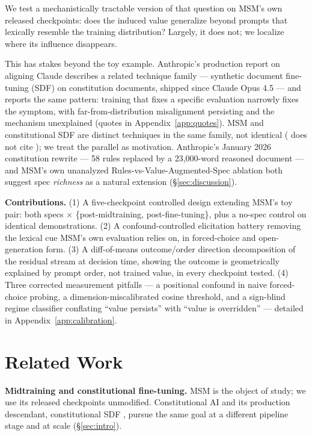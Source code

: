 \documentclass{article}
\begin{document}
We test a mechanistically tractable version of that question on MSM's own released checkpoints: does the induced value generalize beyond prompts that lexically resemble the training distribution? Largely, it does not; we localize where its influence disappears.

This has stakes beyond the toy example. Anthropic's production report on aligning Claude \citep{anthropic2026teachingwhy} describes a related technique family --- synthetic document fine-tuning (SDF) on constitution documents, shipped since Claude Opus 4.5 --- and reports the same pattern: training that fixes a specific evaluation narrowly fixes the symptom, with far-from-distribution misalignment persisting and the mechanism unexplained (quotes in Appendix~\ref{app:quotes}). MSM and constitutional SDF are distinct techniques in the same family, not identical (\citet{anthropic2026teachingwhy} does not cite \citet{li2026msm}); we treat the parallel as motivation. Anthropic's January 2026 constitution rewrite --- 58 rules replaced by a 23{,}000-word reasoned document \citep{anthropic2026constitution} --- and MSM's own unanalyzed Rules-vs-Value-Augmented-Spec ablation both suggest spec \emph{richness} as a natural extension (\S\ref{sec:discussion}).

\textbf{Contributions.} (1) A five-checkpoint controlled design extending MSM's toy pair: both specs $\times$ \{post-midtraining, post-fine-tuning\}, plus a no-spec control on identical demonstrations. (2) A confound-controlled elicitation battery removing the lexical cue MSM's own evaluation relies on, in forced-choice and open-generation form. (3) A diff-of-means outcome/order direction decomposition of the residual stream at decision time, showing the outcome is geometrically explained by prompt order, not trained value, in every checkpoint tested. (4) Three corrected measurement pitfalls --- a positional confound in naive forced-choice probing, a dimension-miscalibrated cosine threshold, and a sign-blind regime classifier conflating ``value persists'' with ``value is overridden'' --- detailed in Appendix~\ref{app:calibration}.

\section{Related Work}
\label{sec:related}

\textbf{Midtraining and constitutional fine-tuning.} MSM \citep{li2026msm} is the object of study; we use its released checkpoints unmodified. Constitutional AI \citep{bai2022constitutional} and its production descendant, constitutional SDF \citep{anthropic2026teachingwhy}, pursue the same goal at a different pipeline stage and at scale (\S\ref{sec:intro}).
\end{document}
